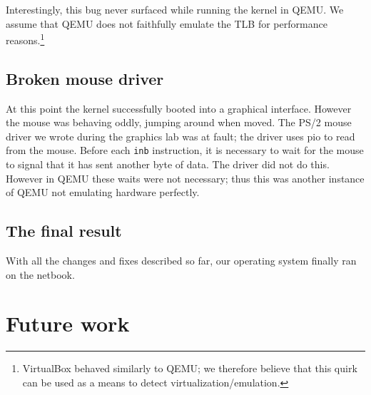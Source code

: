 \documentclass{report}
\begin{document}
Interestingly, this bug never surfaced while running the kernel in QEMU. We
assume that QEMU does not faithfully emulate the TLB for performance
reasons.\footnote{VirtualBox behaved similarly to QEMU; we therefore believe
that this quirk can be used as a means to detect virtualization/emulation.}


\section{Broken mouse driver}
At this point the kernel successfully booted into a graphical interface.
However the mouse was behaving oddly, jumping around when moved. The PS/2
mouse driver we wrote during the graphics lab was at fault; the driver uses
\gls{pio} to read from the mouse. Before each \texttt{inb} instruction, it is
necessary to wait for the mouse to signal that it has sent another byte of
data. The driver did not do this. However in QEMU these waits were not
necessary; thus this was another instance of QEMU not emulating hardware
perfectly.


\section{The final result}
With all the changes and fixes described so far, our operating system finally
ran on the netbook.




\chapter{Future work}


% 
\end{document}
